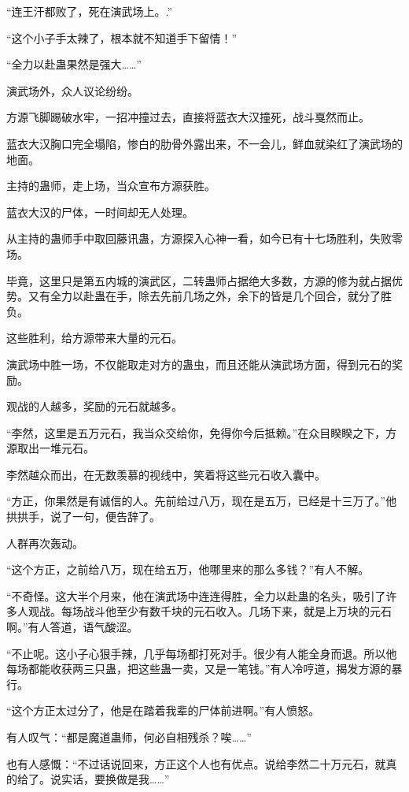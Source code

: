 
\begin{this_body}

“连王汗都败了，死在演武场上。.”

“这个小子手太辣了，根本就不知道手下留情！”

“全力以赴蛊果然是强大……”

演武场外，众人议论纷纷。

方源飞脚踢破水牢，一招冲撞过去，直接将蓝衣大汉撞死，战斗戛然而止。

蓝衣大汉胸口完全塌陷，惨白的肋骨外露出来，不一会儿，鲜血就染红了演武场的地面。

主持的蛊师，走上场，当众宣布方源获胜。

蓝衣大汉的尸体，一时间却无人处理。

从主持的蛊师手中取回藤讯蛊，方源探入心神一看，如今已有十七场胜利，失败零场。

毕竟，这里只是第五内城的演武区，二转蛊师占据绝大多数，方源的修为就占据优势。又有全力以赴蛊在手，除去先前几场之外，余下的皆是几个回合，就分了胜负。

这些胜利，给方源带来大量的元石。

演武场中胜一场，不仅能取走对方的蛊虫，而且还能从演武场方面，得到元石的奖励。

观战的人越多，奖励的元石就越多。

“李然，这里是五万元石，我当众交给你，免得你今后抵赖。”在众目睽睽之下，方源取出一堆元石。

李然越众而出，在无数羡慕的视线中，笑着将这些元石收入囊中。

“方正，你果然是有诚信的人。先前给过八万，现在是五万，已经是十三万了。”他拱拱手，说了一句，便告辞了。

人群再次轰动。

“这个方正，之前给八万，现在给五万，他哪里来的那么多钱？”有人不解。

“不奇怪。这大半个月来，他在演武场中连连得胜，全力以赴蛊的名头，吸引了许多人观战。每场战斗他至少有数千块的元石收入。几场下来，就是上万块的元石啊。”有人答道，语气酸涩。

“不止呢。这小子心狠手辣，几乎每场都打死对手。很少有人能全身而退。所以他每场都能收获两三只蛊，把这些蛊一卖，又是一笔钱。”有人冷哼道，揭发方源的暴行。

“这个方正太过分了，他是在踏着我辈的尸体前进啊。”有人愤怒。

有人叹气：“都是魔道蛊师，何必自相残杀？唉……”

也有人感慨：“不过话说回来，方正这个人也有优点。说给李然二十万元石，就真的给了。说实话，要换做是我……”


\end{this_body}
